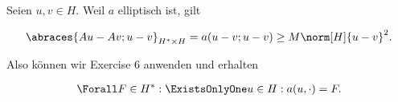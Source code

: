 \begin{solution}
\begin{enumerate}[label = \textbf{\alph*)}]
\begin{itemize}
    Seien $u, v \in H$.
    Weil $a$ elliptisch ist, gilt

    \begin{align*}
      \abraces{Au - Av; u - v}_{H^\ast \times H}
      =
      a(u - v; u - v)
      \geq
      M \norm[H]{u - v}^2.
    \end{align*}

  \end{itemize}

  Also können wir Exercise 6 anwenden und erhalten

  \begin{align*}
    \Forall F \in H^\ast:
    \ExistsOnlyOne u \in H:
    a(u, \cdot) = F.
  \end{align*}

\end{enumerate}

\end{solution}

